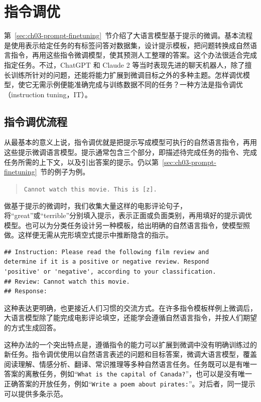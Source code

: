 \section{指令调优}
\label{sec:ch04-instruction}
第~\ref{sec:ch03-prompt-finetuning}~节介绍了大语言模型基于提示的微调。基本流程是使用表示给定任务的有标签问答对数据集，设计提示模板，把问题转换成自然语言指令，再用这些指令微调模型，使其预测人工整理的答案。这个办法很适合完成指定任务。不过，ChatGPT 和 Claude 2 等当时表现先进的聊天机器人，除了擅长训练所针对的问题，还能将能力扩展到微调目标之外的多种主题。怎样调优模型，使它无需示例便能准确完成与训练数据不同的任务？一种方法是指令调优（instruction tuning，IT）。

\subsection{指令调优流程}
从最基本的意义上说，指令调优就是把提示写成模型可执行的自然语言指令，再用这些提示微调语言模型。提示通常包含三个部分，即描述待完成任务的指令、完成任务所需的上下文，以及引出答案的提示。仍以第~\ref{sec:ch03-prompt-finetuning}~节的例子为例。
\begin{quote}
\texttt{Cannot watch this movie. This is [z].}
\end{quote}

做基于提示的微调时，我们收集大量这样的电影评论句子，将“great”或“terrible”分别填入提示，表示正面或负面类别，再用填好的提示调优模型。也可以为分类任务设计另一种模板，给出明确的自然语言指令，使模型照做。这样便无需从完形填空式提示中推断隐含的指示。

\begin{lstlisting}[nolol=true]
## Instruction: Please read the following film review and
determine if it is a positive or negative review. Respond
'positive' or 'negative', according to your classification.
## Review: Cannot watch this movie.
## Response:
\end{lstlisting}

这种表达更明确，也更接近人们习惯的交流方式。在许多指令模板样例上微调后，大语言模型除了能完成电影评论填空，还能学会遵循自然语言指令，并按人们期望的方式生成回答。

这种办法的一个突出特点是，遵循指令的能力可以扩展到微调中没有明确训练过的新任务。指令调优使用以自然语言表述的问题和目标答案，微调大语言模型，覆盖阅读理解、情感分析、翻译、常识推理等多种自然语言任务。任务既可以是有唯一答案的离散任务，例如“\texttt{What is the capital of Canada?}”，也可以是没有唯一正确答案的开放任务，例如“\texttt{Write a poem about pirates:}”。对后者，同一提示可以提供多条示范。

